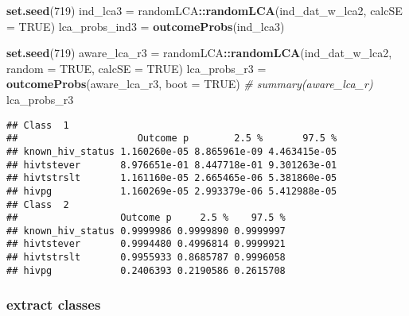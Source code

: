 \documentclass[
]{article}
\newenvironment{Shaded}{\begin{snugshade}}{\end{snugshade}}
\newcommand{\CommentTok}[1]{\textcolor[rgb]{0.56,0.35,0.01}{\textit{#1}}}
\newcommand{\DataTypeTok}[1]{\textcolor[rgb]{0.13,0.29,0.53}{#1}}
\newcommand{\DecValTok}[1]{\textcolor[rgb]{0.00,0.00,0.81}{#1}}
\newcommand{\KeywordTok}[1]{\textcolor[rgb]{0.13,0.29,0.53}{\textbf{#1}}}
\newcommand{\NormalTok}[1]{#1}
\newcommand{\OperatorTok}[1]{\textcolor[rgb]{0.81,0.36,0.00}{\textbf{#1}}}
\newcommand{\OtherTok}[1]{\textcolor[rgb]{0.56,0.35,0.01}{#1}}
\newcommand{\StringTok}[1]{\textcolor[rgb]{0.31,0.60,0.02}{#1}}
\begin{document}
\begin{Shaded}
\begin{Highlighting}[]
\KeywordTok{set.seed}\NormalTok{(}\DecValTok{719}\NormalTok{)}
\NormalTok{ind_lca3 =}\StringTok{ }\NormalTok{randomLCA}\OperatorTok{::}\KeywordTok{randomLCA}\NormalTok{(ind_dat_w_lca2, }\DataTypeTok{calcSE =} \OtherTok{TRUE}\NormalTok{)}
\NormalTok{lca_probs_ind3 =}\StringTok{ }\KeywordTok{outcomeProbs}\NormalTok{(ind_lca3)}
\end{Highlighting}
\end{Shaded}

\begin{Shaded}
\begin{Highlighting}[]
\KeywordTok{set.seed}\NormalTok{(}\DecValTok{719}\NormalTok{)}
\NormalTok{aware_lca_r3 =}\StringTok{ }\NormalTok{randomLCA}\OperatorTok{::}\KeywordTok{randomLCA}\NormalTok{(ind_dat_w_lca2, }\DataTypeTok{random =} \OtherTok{TRUE}\NormalTok{, }\DataTypeTok{calcSE =} \OtherTok{TRUE}\NormalTok{)}
\NormalTok{lca_probs_r3 =}\StringTok{ }\KeywordTok{outcomeProbs}\NormalTok{(aware_lca_r3, }\DataTypeTok{boot =} \OtherTok{TRUE}\NormalTok{)}
\CommentTok{# summary(aware_lca_r)}
\NormalTok{lca_probs_r3}
\end{Highlighting}
\end{Shaded}

\begin{verbatim}
## Class  1 
##                     Outcome p        2.5 %       97.5 %
## known_hiv_status 1.160260e-05 8.865961e-09 4.463415e-05
## hivtstever       8.976651e-01 8.447718e-01 9.301263e-01
## hivtstrslt       1.161160e-05 2.665465e-06 5.381860e-05
## hivpg            1.160269e-05 2.993379e-06 5.412988e-05
## Class  2 
##                  Outcome p     2.5 %    97.5 %
## known_hiv_status 0.9999986 0.9999890 0.9999997
## hivtstever       0.9994480 0.4996814 0.9999921
## hivtstrslt       0.9955933 0.8685787 0.9996058
## hivpg            0.2406393 0.2190586 0.2615708
\end{verbatim}

\hypertarget{extract-classes-2}{%
\subsubsection{extract classes}\label{extract-classes-2}}

\begin{Shaded}
\end{Shaded}
\end{document}
